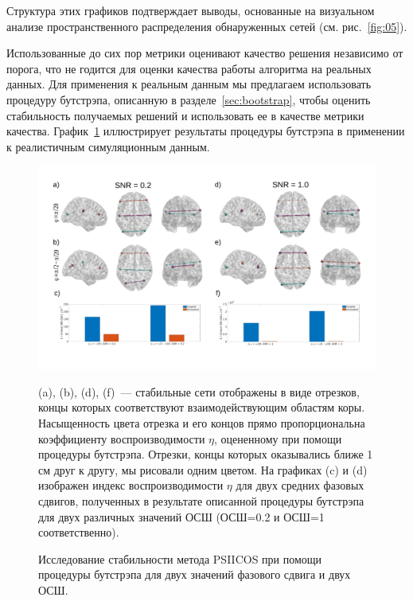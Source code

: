 Структура этих графиков подтверждает выводы, основанные на визуальном анализе
пространственного распределения обнаруженных сетей (см. рис.~\ref{fig:05}).

Использованные до сих пор метрики оценивают качество решения независимо от порога,
что не годится для оценки качества работы алгоритма на реальных данных.
Для применения к реальным данным мы предлагаем использовать процедуру бутстрэпа,
описанную в разделе~\ref{sec:bootstrap}, чтобы оценить стабильность
получаемых решений и использовать ее в качестве метрики качества.
График~\ref{fig:08} иллюстрирует результаты процедуры
бутстрэпа в применении к реалистичным симуляционным данным.

\begin{figure}[!ht]
 \includegraphics[width=\textwidth]{../images/psiicos_paper/Figure8_hr.jpg}
 \caption{Исследование стабильности метода PSIICOS при помощи процедуры бутстрэпа для
 двух значений фазового сдвига и двух ОСШ.}\label{fig:08}
 (a), (b), (d), (f)~--- стабильные сети отображены в виде отрезков, концы которых
 соответствуют взаимодействующим областям коры. Насыщенность цвета отрезка
 и его концов прямо пропорциональна коэффициенту воспроизводимости $\eta$,
 оцененному при помощи процедуры бутстрэпа. Отрезки, концы которых
 оказывались ближе 1 см друг к другу, мы рисовали одним цветом.
 На графиках (c) и (d) изображен индекс воспроизводимости $\eta$ для
 двух средних фазовых сдвигов, полученных в результате описанной процедуры
 бутстрэпа для двух различных значений ОСШ (ОСШ=0.2 и ОСШ=1 соответственно).
\end{figure}%


